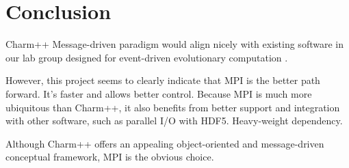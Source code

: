 \section{Conclusion}

Charm++ 
Message-driven paradigm would align nicely with existing software in our lab group designed for event-driven evolutionary computation \cite{lalejini2018evolving}.

However, this project seems to clearly indicate that MPI is the better path forward.
It's faster and allows better control.
Because MPI is much more ubiquitous than Charm++, it also benefits from better support and integration with other software, such as parallel I/O with HDF5.
Heavy-weight dependency.

Although Charm++ offers an appealing object-oriented and message-driven conceptual framework, MPI is the obvious choice.

